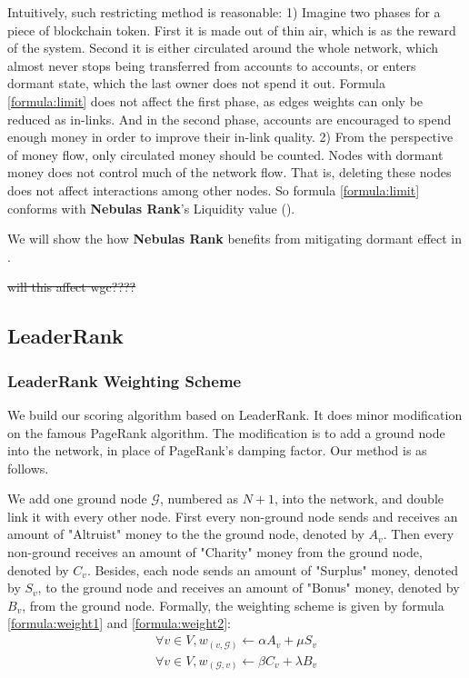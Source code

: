 Intuitively, such restricting method is reasonable: 1) Imagine two phases for a piece of blockchain token. First it is made out of thin air, which is as the reward of the system. Second it is either circulated around the whole network, which almost never stops being transferred from accounts to accounts, or enters dormant state, which the last owner does not spend it out. Formula \ref{formula:limit} does not affect the first phase, as edges weights can only be reduced as in-links. And in the second phase, accounts are encouraged to spend enough money in order to improve their in-link quality. 2) From the perspective of money flow, only circulated money should be counted. Nodes with dormant money does not control much of the network flow. That is, deleting these nodes does not affect interactions among other nodes. So formula \ref{formula:limit} conforms with \textbf{Nebulas Rank}'s Liquidity value ().

We will show the how \textbf{Nebulas Rank} benefits from mitigating dormant effect in .

\st{will this affect wgc????}

\subsection{LeaderRank} \label{sec:leaderrank}

\subsubsection{LeaderRank Weighting Scheme}
We build our scoring algorithm based on LeaderRank\cite{Li2014}\cite{Chen2013}. It does minor modification on the famous PageRank algorithm\cite{Brin2010}\cite{page1999pagerank}. The modification is to add a ground node into the network, in place of PageRank's damping factor. Our method is as follows.

We add one ground node $\mathcal{G}$, numbered as $N+1$, into the network, and double link it with every other node. First every non-ground node sends and receives an amount of "Altruist" money to the the ground node, denoted by $A_v$. Then every non-ground receives an amount of "Charity" money from the ground node, denoted by $C_v$. Besides, each node sends an amount of "Surplus" money, denoted by $S_v$, to the ground node and receives an amount of "Bonus" money, denoted by $B_v$, from the ground node. Formally, the weighting scheme is given by formula \ref{formula:weight1} and \ref{formula:weight2}:
\begin{align}\label{formula:weight1}
	\forall v \in V, w_{(v, \mathcal{G})} \leftarrow \alpha A_v + \mu S_v
\end{align}
\begin{align}\label{formula:weight2}
\forall v \in V, w_{(\mathcal{G}, v)} \leftarrow \beta C_v + \lambda B_v
\end{align}

